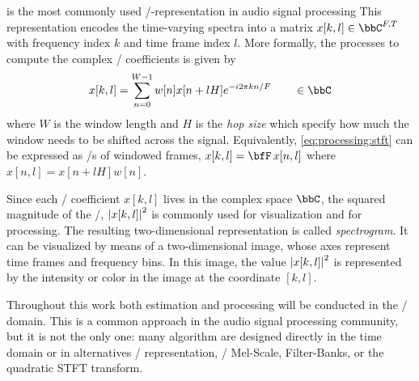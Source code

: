 is the most commonly used \TF/-representation in audio signal processing
This representation encodes the time-varying spectra into a matrix $x[k,l] \in \bbC^{F,T}$ with frequency index $k$ and time frame index $l$. More formally, the processes to compute the complex \STFT/ coefficients is given by
\begin{equation}\label{eq:processing:stft}
    x[k, l]  = \sum_{n=0}^{W-1} w[n] x[n + l H] \cste^{- \csti 2 \pi k n / F} \mathspace\in\bbC
\end{equation}
where $W$ is the window length and $H$ is the \textit{hop size} which specify how much the window needs to be shifted across the signal.
Equivalently, \cref{eq:processing:stft} can be expressed as \DFT/s of windowed frames, $x[k, l] = \discreteFT{x[n,l]}$ where $x[n,l] = x[n + l H] w[n]$.

Since each \STFT/ coefficient $x[k, l]$ lives in the complex space $\bbC$, the squared magnitude of the \STFT/, $\powerOf{x[k,l]}$ is
commonly used for visualization and for processing.
The resulting two-dimensional representation is called \textit{spectrogram}.
It can be visualized by means of a two-dimensional image, whose axes represent time frames and frequency bins.
In this image, the value $\powerOf{x[k,l]}$ is represented by the intensity or color in the image at the coordinate $[k,l]$.

Throughout this work both estimation and processing will be conducted in the \STFT/ domain.
This is a common approach in the audio signal processing community, but it is not the only one:
many algorithm are designed directly in the time domain or in alternatives \TF/ representation, \eg/ Mel-Scale, Filter-Banks, or the quadratic STFT transform.

